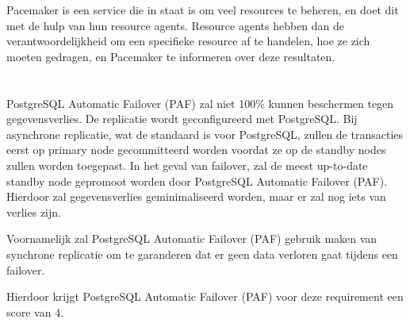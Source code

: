 Pacemaker is een service die in staat is om veel resources te beheren, en doet dit met de hulp van hun resource agents. Resource agents hebben dan de verantwoordelijkheid om een specifieke resource af te handelen, hoe ze zich moeten gedragen, en Pacemaker te informeren over deze resultaten.


\section{}
\label{sec:Requirements}

\subsection{}
\label{subsec:Must have}



\subsubsection{}
\label{subsubsec:Replicatie}

PostgreSQL Automatic Failover (PAF) zal niet 100\% kunnen beschermen tegen gegevensverlies. De replicatie wordt geconfigureerd met PostgreSQL. Bij asynchrone replicatie, wat de standaard is voor PostgreSQL, zullen de transacties eerst op primary node gecommitteerd worden voordat ze op de standby nodes zullen worden toegepast. In het geval van failover, zal de meest up-to-date standby node gepromoot worden door PostgreSQL Automatic Failover (PAF). Hierdoor zal gegevensverlies geminimaliseerd worden, maar er zal nog iets van verlies zijn. 

Voornamelijk zal PostgreSQL Automatic Failover (PAF) gebruik maken van synchrone replicatie om te garanderen dat er geen data verloren gaat tijdens een failover.

Hierdoor krijgt PostgreSQL Automatic Failover (PAF) voor deze requirement  een score van 4.

\subsubsection{}
\label{subsubsec:Failover}

